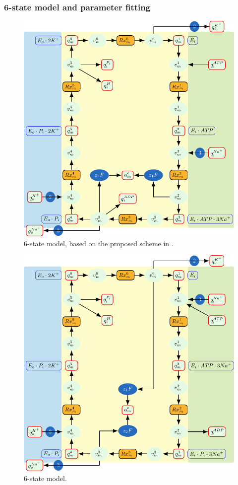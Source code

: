 \documentclass{biophys-new}
\begin{document}
\subsubsection{6-state model and parameter fitting}

\cite{nguyen_structural_2022}
\begin{figure}
\caption{6-state model, based on the proposed scheme in \cite{nguyen_structural_2022}.}
\centering
\includegraphics[width=0.7\linewidth]{6state_2.pdf}
\end{figure}


\begin{figure}
\caption{6-state model.}
\centering
\includegraphics[width=0.7\linewidth]{6state_1.pdf}
\end{figure}

\end{document}
